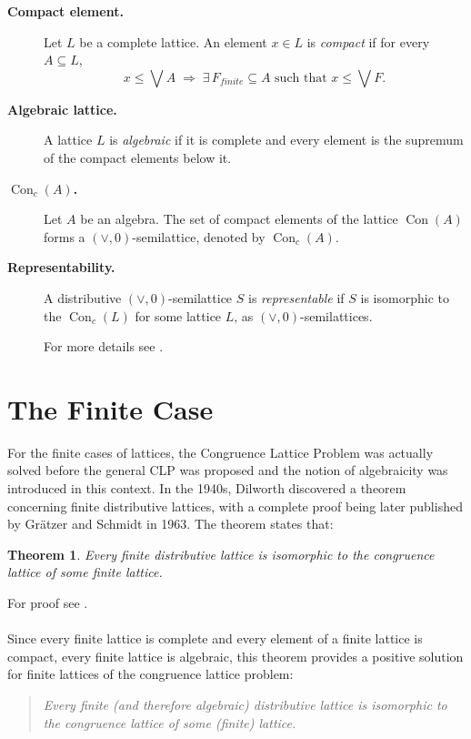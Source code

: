 ﻿\documentclass{article}
\newtheorem{theorem}{Theorem}[section]
\begin{document}
\begin{description}
\item[\textbf{Compact element.}] Let $L$ be a complete lattice. An element $x \in L$ is \textit{compact} if for every $A \subseteq L$,
\[
x \leq \bigvee A \;\Rightarrow\; \exists\, F_{finite} \subseteq A \text{ such that } x \leq \bigvee F .
\]

\item[\textbf{Algebraic lattice.}] A lattice $L$ is \textit{algebraic} if it is complete and every element is the supremum of the compact elements below it.

\item[\textbf{\boldmath$\operatorname{Con}_c(A)$.}]
Let $A$ be an algebra. The set of compact elements of the lattice $\operatorname{Con}(A)$ forms a $(\vee,0)$-semilattice, denoted by $\operatorname{Con}_c(A)$.

\item[\textbf{Representability.}] A distributive $(\vee,0)$-semilattice $S$ is \emph{representable} if
$S$ is isomorphic to the $\operatorname{Con}_c(L)$ for some lattice $L$, as $(\vee,0)$-semilattices.

For more details see \cite{GratzerGLT1998}.
\end{description}

\section{The Finite Case}

For the finite cases of lattices, the Congruence Lattice Problem was actually solved before the general CLP was proposed and the notion of algebraicity was introduced in this context.
In the 1940s, Dilworth discovered a theorem concerning finite distributive lattices, with a complete proof being later published by Grätzer and
Schmidt in 1963. The theorem states that:
\begin{theorem}
\textit{Every finite distributive lattice is isomorphic to the congruence lattice
of some finite lattice.}
\end{theorem}

For proof see \cite[Theorem~8.1, p.~101]{GratzerCFL}.
\\ \\
Since every finite lattice is complete and every element of a finite lattice is compact, every finite lattice is algebraic, this theorem provides a positive solution for finite lattices of the congruence lattice problem:
\begin{quote}
\textit{Every finite (and therefore algebraic) distributive lattice is isomorphic to the congruence lattice of some (finite) lattice.}
\end{quote}
\end{document}
